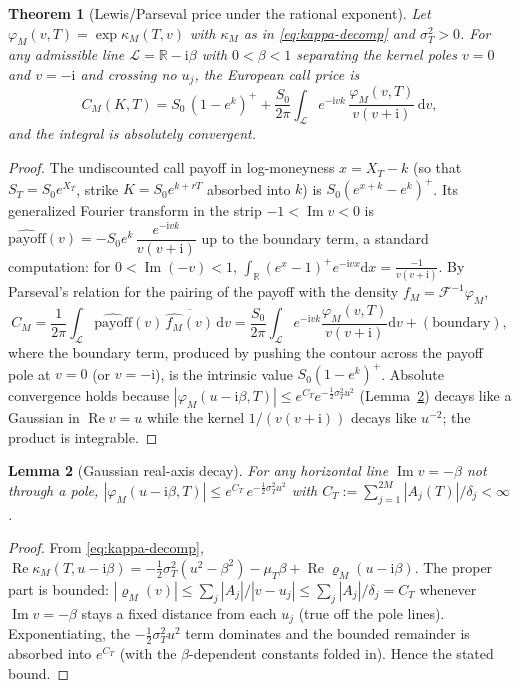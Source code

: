 \documentclass[11pt]{article}
\DeclareMathOperator{\Real}{Re}
\DeclareMathOperator{\Imag}{Im}
\newcommand{\R}{\mathbb{R}}
\newcommand{\Ii}{\mathrm{i}}
\newcommand{\dd}{\mathrm{d}}
\theoremstyle{plain}
\newtheorem{theorem}{Theorem}[section]
\newtheorem{lemma}[theorem]{Lemma}
\theoremstyle{definition}
\theoremstyle{remark}
\begin{document}
\begin{theorem}[Lewis/Parseval price under the rational exponent]\label{thm:lewis}
Let $\varphi_M(v,T)=\exp\kappa_M(T,v)$ with $\kappa_M$ as in
\eqref{eq:kappa-decomp} and $\sigma_T^2>0$. For any admissible line
$\mathcal L=\R-\Ii\beta$ with $0<\beta<1$ separating the kernel poles $v=0$ and
$v=-\Ii$ and crossing no $u_j$, the European call price is
\begin{equation}\label{eq:lewisprice}
   C_M(K,T)=S_0\,(1-e^{k})^{+}
   +\frac{S_0}{2\pi}\int_{\mathcal L}
      e^{-\Ii v k}\,\frac{\varphi_M(v,T)}{v(v+\Ii)}\,\dd v,
\end{equation}
and the integral is absolutely convergent.
\end{theorem}
\begin{proof}
The undiscounted call payoff in log-moneyness $x=X_T-k$ (so that $S_T=S_0e^{X_T}$,
strike $K=S_0e^{k+rT}$ absorbed into $k$) is $S_0(e^{x+k}-e^{k})^+$. Its
generalized Fourier transform in the strip $-1<\Imag v<0$ is
$\widehat{\mathrm{payoff}}(v)=-S_0e^{k}\,\dfrac{e^{-\Ii vk}}{v(v+\Ii)}$ up to the
boundary term, a standard computation: for $0<\Imag(-v)<1$,
$\int_\R (e^{x}-1)^+e^{-\Ii vx}\dd x=\frac{-1}{v(v+\Ii)}$. By Parseval's relation
for the pairing of the payoff with the density $f_M=\mathcal F^{-1}\varphi_M$,
\[
   C_M=\frac{1}{2\pi}\int_{\mathcal L}\widehat{\mathrm{payoff}}(v)\,
      \overline{\widehat{f_M}(v)}\,\dd v
   =\frac{S_0}{2\pi}\int_{\mathcal L}e^{-\Ii vk}
      \frac{\varphi_M(v,T)}{v(v+\Ii)}\dd v + (\text{boundary}),
\]
where the boundary term, produced by pushing the contour across the payoff pole at
$v=0$ (or $v=-\Ii$), is the intrinsic value $S_0(1-e^k)^+$. Absolute convergence
holds because $|\varphi_M(u-\Ii\beta,T)|\le e^{C_T}e^{-\frac12\sigma_T^2 u^2}$
(Lemma~\ref{lem:gaussdecay}) decays like a Gaussian in $\Real v=u$ while the kernel
$1/(v(v+\Ii))$ decays like $u^{-2}$; the product is integrable.
\end{proof}

\begin{lemma}[Gaussian real-axis decay]\label{lem:gaussdecay}
For any horizontal line $\Imag v=-\beta$ not through a pole,
$|\varphi_M(u-\Ii\beta,T)|\le e^{C_T}\,e^{-\frac12\sigma_T^2 u^2}$ with
$C_T:=\sum_{j=1}^{2M}|A_j(T)|/\delta_j<\infty$.
\end{lemma}
\begin{proof}
From \eqref{eq:kappa-decomp}, $\Real\kappa_M(T,u-\Ii\beta)=
-\tfrac12\sigma_T^2(u^2-\beta^2)-\mu_T\beta+\Real\varrho_M(u-\Ii\beta)$. The proper
part is bounded: $|\varrho_M(v)|\le\sum_j|A_j|/|v-u_j|\le\sum_j|A_j|/\delta_j=C_T$
whenever $\Imag v=-\beta$ stays a fixed distance from each $u_j$ (true off the pole
lines). Exponentiating, the $-\tfrac12\sigma_T^2u^2$ term dominates and the bounded
remainder is absorbed into $e^{C_T}$ (with the $\beta$-dependent constants folded
in). Hence the stated bound.
\end{proof}
\end{document}
